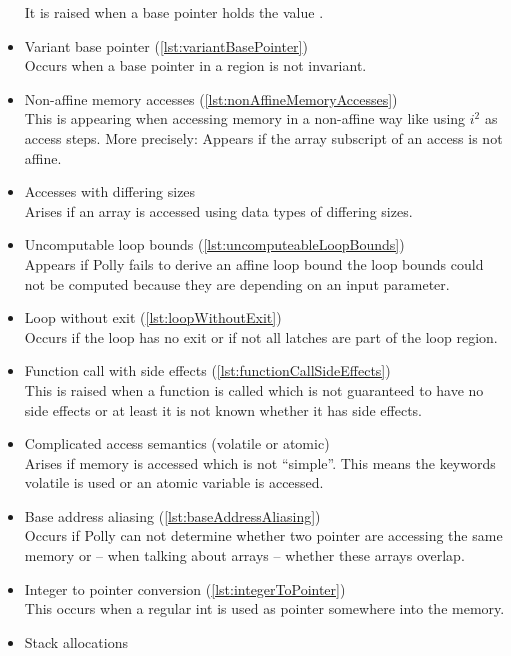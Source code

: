 \begin{itemize}
        It is raised when a base pointer holds the value \undefv.
    \item Variant base pointer (\autoref{lst:variantBasePointer})\\
        Occurs when a base pointer in a region is not invariant.
    \item Non-affine memory accesses (\autoref{lst:nonAffineMemoryAccesses})\\
        This is appearing when accessing memory in a non-affine way like using \(i^2\) as access steps.
        More precisely: Appears if the array subscript of an access is not affine.
    \item Accesses with differing sizes\\
        Arises if an array is accessed using data types of differing sizes.
    \item Uncomputable loop bounds (\autoref{lst:uncomputeableLoopBounds})\\
        Appears if Polly fails to derive an affine loop bound \eg the loop bounds could not be computed because they are depending on an input parameter.
    \item Loop without exit (\autoref{lst:loopWithoutExit})\\
        Occurs if the loop has no exit or if not all latches are part of the loop region.
    \item Function call with side effects (\autoref{lst:functionCallSideEffects})\\
        This is raised when a function is called which is not guaranteed to have no side effects or at least it is not known whether it has side effects.
    \item Complicated access semantics (volatile or atomic)\\
        Arises if memory is accessed which is not \enquote{simple}.
        This means the keywords volatile is used or an atomic variable is accessed.
    \item Base address aliasing (\autoref{lst:baseAddressAliasing})\\
        Occurs if Polly can not determine whether two pointer are accessing the same memory or -- when talking about arrays -- whether these arrays overlap.
    \item Integer to pointer conversion (\autoref{lst:integerToPointer})\\
        This occurs when a regular int is used as pointer somewhere into the memory.
    \item Stack allocations\\

\end{itemize}
